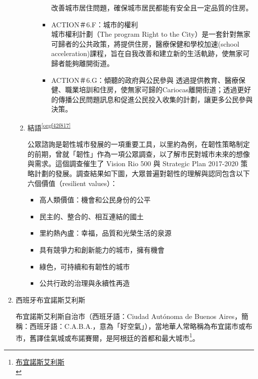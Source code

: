 \documentclass[a4paper,12pt]{article}
\begin{document}
\begin{enumerate}
\begin{enumerate}
\begin{enumerate}
\begin{itemize}
改善城市居住問題，確保城市居民都能有安全且一定品質的住房。\\
\item ACTION＃6.F：城市的權利\\
城市權利計劃（The program Right to the City）是一套針對無家可歸者的公共政策，將提供住房，醫療保健和學校加速(school acceleration)課程，旨在自我改善和建立新的生活軌跡，使無家可歸者能夠離開街道。\\
\item ACTION＃6.G：傾聽的政府與公民參與  透過提供教育、醫療保健、職業培訓和住房，使無家可歸的Cariocas離開街道；透過更好的傳播公民問題訊息和促進公民投入收集的計劃，讓更多公民參與決策。\\
\end{itemize}
\end{enumerate}
\item 結語\textsuperscript{\ref{orgf42f817}}
\label{sec:org2db993e}

公眾諮詢是韌性城市發展的一項重要工具，以里約為例，在韌性策略制定的前期，曾就「韌性」作為一項公眾調查，以了解市民對城市未來的想像與需求。這個調查催生了 Vision Rio 500 與 Strategic Plan 2017-2020 策略計劃的發展。調查結果如下圖，大眾普遍對韌性的理解與認同包含以下六個價值（resilient values）：\\
\begin{itemize}
\item 高人類價值：機會和公民身份的公平\\
\item 民主的、整合的、相互連結的國土\\
\item 里約熱內盧：幸福，品質和光榮生活的泉源\\
\item 具有競爭力和創新能力的城市，擁有機會\\
\item 綠色，可持續和有韌性的城市\\
\item 公共行政的治理與永續性再造\\
\end{itemize}
\end{enumerate}

\item 西班牙布宜諾斯艾利斯
\label{sec:orgcc067ef}

布宜諾斯艾利斯自治市（西班牙語：Ciudad Autónoma de Buenos Aires，簡稱：西班牙語：C.A.B.A.，意為「好空氣」），當地華人常略稱為布宜諾市或布市，舊譯佳氣城或布諾賽爾，是阿根廷的首都和最大城市\footnote{\href{https://zh.wikipedia.org/wiki/\%E5\%B8\%83\%E5\%AE\%9C\%E8\%AB\%BE\%E6\%96\%AF\%E8\%89\%BE\%E5\%88\%A9\%E6\%96\%AF}{布宜諾斯艾利斯}\\}。\\


\end{enumerate}
\end{document}
